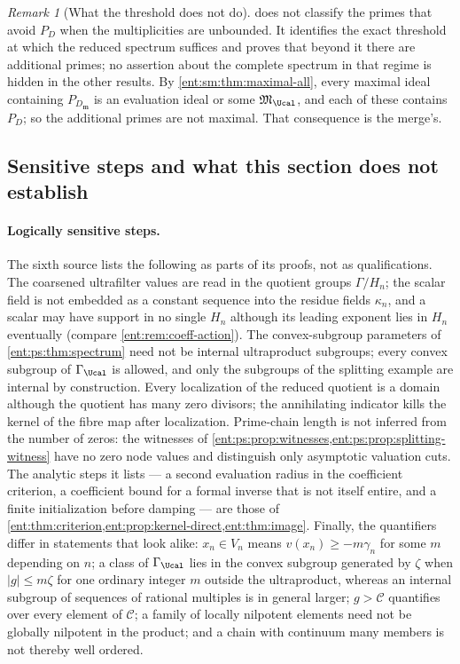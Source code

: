 \documentclass[11pt]{article}
\theoremstyle{plain}
\theoremstyle{plain}
\theoremstyle{plain}
\theoremstyle{definition}
\theoremstyle{definition}
\theoremstyle{definition}
\theoremstyle{definition}
\theoremstyle{remark}
\newtheorem{remark}[remark]{Remark}
\newcommand{\abs}[1]{\lvert#1\rvert}
\begin{document}
\begin{remark}[What the threshold does not do]
 does not classify the primes that avoid $P_D$
when the multiplicities are unbounded. It identifies the exact threshold at
which the reduced spectrum suffices and proves that beyond it there are
additional primes; no assertion about the complete spectrum in that regime is
hidden in the other results. By \cref{ent:sm:thm:maximal-all}, every maximal
ideal containing $P_{D_{\mathbf m}}$ is an evaluation ideal or some
$\mathfrak M_\Ucal$, and each of these contains $P_D$; so the additional
primes are not maximal. That consequence is the merge's.
\end{remark}

\subsection{Sensitive steps and what this section does not establish}
\label{ent:ps:subsec:limits}

\paragraph{Logically sensitive steps.}
The sixth source lists the following as parts of its proofs, not as
qualifications. The coarsened ultrafilter values are read in the quotient
groups $\Gamma/H_n$; the scalar field is not embedded as a constant sequence
into the residue fields $\kappa_n$, and a scalar may have support in no single
$H_n$ although its leading exponent lies in $H_n$ eventually (compare
\cref{ent:rem:coeff-action}). The convex-subgroup parameters of
\cref{ent:ps:thm:spectrum} need not be internal ultraproduct subgroups; every
convex subgroup of $\Gamma_\Ucal$ is allowed, and only the subgroups of the
splitting example are internal by construction. Every localization of the
reduced quotient is a domain although the quotient has many zero divisors;
the annihilating indicator kills the kernel of the fibre map after
localization. Prime-chain length is not inferred from the number of zeros:
the witnesses of \cref{ent:ps:prop:witnesses,ent:ps:prop:splitting-witness}
have no zero node values and distinguish only asymptotic valuation cuts. The
analytic steps it lists --- a second evaluation radius in the coefficient
criterion, a coefficient bound for a formal inverse that is not itself
entire, and a finite initialization before damping --- are those of
\cref{ent:thm:criterion,ent:prop:kernel-direct,ent:thm:image}. Finally, the
quantifiers differ in statements that look alike: $x_n\in V_n$ means
$v(x_n)\ge-m\gamma_n$ for some $m$ depending on $n$; a class of
$\Gamma_\Ucal$ lies in the convex subgroup generated by $\zeta$ when
$\abs g\le m\zeta$ for one ordinary integer $m$ outside the ultraproduct,
whereas an internal subgroup of sequences of rational multiples is in general
larger; $g>\mathcal C$ quantifies over every element of $\mathcal C$; a
family of locally nilpotent elements need not be globally nilpotent in the
product; and a chain with continuum many members is not thereby well
ordered.
\end{document}

